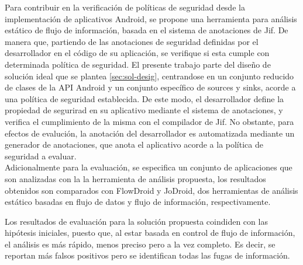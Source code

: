 Para contribuir en la verificación de políticas de seguridad desde la
implementación de aplicativos Android, se propone una herramienta para análisis
estático de flujo de información, basada en el sistema de anotaciones de Jif.
De manera que, partiendo de las anotaciones de seguridad definidas por el
desarrollador en el código de su aplicación, se verifique si esta cumple 
con determinada política de seguridad.\newline
El presente trabajo parte del diseño de solución ideal que se plantea
\ref{sec:sol-desig}, centrandose en un conjunto reducido de clases de la API
Android y un conjunto específico de sources y sinks, acorde a una política de
seguridad establecida.\newline 
De este modo, el desarrollador define la propiedad de segurirad en su
aplicativo mediante el sistema de anotaciones, y verifica el cumplimiento de la
misma con el compilador de Jif.\newline 
No obstante, para efectos de evalución, la anotación del desarrollador es
automatizada mediante un generador de anotaciones, que anota el aplicativo
acorde a la política de seguridad a evaluar.\\
Adicionalmente para la evaluación, se especifica un conjunto de aplicaciones que
son analizadas con la la herramienta de análisis propuesta, los resultados
obtenidos son comparados con FlowDroid y JoDroid, dos herramientas de análisis
estático basadas en flujo de datos y flujo de información, respectivamente.

Los resultados de evaluación para la solución propuesta coindiden con las
hipótesis iniciales, puesto que, al estar basada en control de flujo de
información, el análisis es más rápido, menos preciso pero a la vez completo. Es
decir, se reportan más falsos positivos pero se identifican todas las fugas de
información.

























